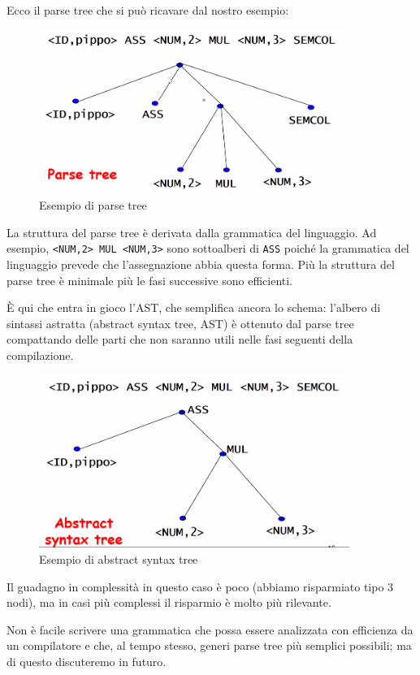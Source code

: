 \documentclass[class=book, crop=false, oneside]{standalone}
\begin{document}
Ecco il parse tree che si può ricavare dal nostro esempio: 
\begin{figure}[H]
	\centering
	\includegraphics[width=0.9\textwidth,keepaspectratio]{parse_tree}
	\caption{Esempio di parse tree}
\end{figure}
La struttura del parse tree è derivata dalla grammatica del linguaggio. Ad esempio, \texttt{<NUM,2> MUL <NUM,3>} sono sottoalberi di \texttt{ASS} poiché la grammatica del linguaggio prevede che l’assegnazione abbia questa forma.
Più la struttura del parse tree è minimale più le fasi successive sono efficienti.

È qui che entra in gioco l’AST, che semplifica ancora lo schema: l’albero di sintassi astratta (abstract syntax tree, AST) è ottenuto dal parse tree compattando delle parti che non saranno utili nelle fasi seguenti della compilazione.
\begin{figure}[H]
	\centering
	\includegraphics[width=0.9\textwidth,keepaspectratio]{abstract_syntax_tree}
	\caption{Esempio di abstract syntax tree}
	\label{esempio_AST}
\end{figure}
Il guadagno in complessità in questo caso è poco (abbiamo risparmiato tipo 3 nodi), ma in casi più complessi il risparmio è molto più rilevante.

Non è facile scrivere una grammatica che possa essere analizzata con efficienza da un compilatore e che, al tempo stesso, generi parse tree più semplici possibili; ma di questo discuteremo in futuro.
\end{document}
